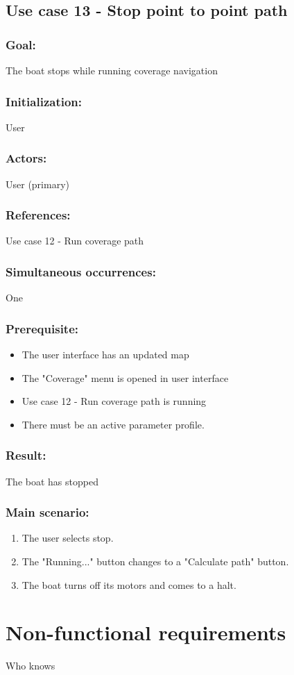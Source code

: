 \begin{framed}
	\subsection{Use case 13 - Stop point to point path}
	\subsubsection*{Goal:}
	The boat stops while running coverage navigation
	
	\subsubsection*{Initialization:}
	User
	
	\subsubsection*{Actors:}
	User (primary)
	
	\subsubsection*{References:}
	Use case 12 - Run coverage path
	
	\subsubsection*{Simultaneous occurrences:}
	One 
	
	\subsubsection*{Prerequisite:}
	\begin{itemize}
		\item The user interface has an updated map
		\item The "Coverage" menu is opened in user interface
		\item Use case 12 - Run coverage path is running
		\item There must be an active parameter profile.
		
	\end{itemize}
	
	\subsubsection*{Result:}
	The boat has stopped
	
	\subsubsection*{Main scenario:}
	\begin{enumerate}
		\item The user selects stop.
		\item The "Running..." button changes to a "Calculate path" button.
		\item The boat turns off its motors and comes to a halt.
	\end{enumerate}	
\end{framed}	

\section{Non-functional requirements}
Who knows